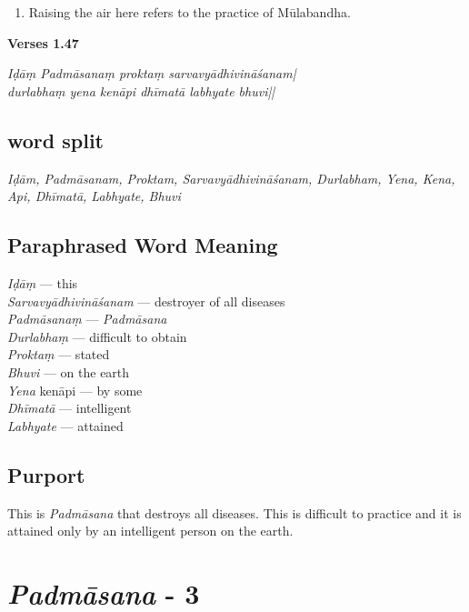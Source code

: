 \begin{enumerate}
\item Raising the air here refers to the practice of Mūlabandha.   
\end{enumerate}

\noindent \textbf{Verses 1.47}

\begin{shloka}
\textit{Iḍāṃ Padmāsanaṃ proktaṃ sarvavyādhivināśanam|\\
durlabhaṃ yena kenāpi dhīmatā labhyate bhuvi||}
\end{shloka}

\subsection*{word split}

\textit{Iḍām, Padmāsanam, Proktam, Sarvavyādhivināśanam,  Durlabham, Yena, Kena, Api, Dhīmatā, Labhyate, Bhuvi}

\subsection*{Paraphrased Word Meaning}

\begin{multicols}{2}
\textit{Iḍāṃ} ---  this  \\
\textit{Sarvavyādhivināśanam} --- destroyer of all diseases  \\
\textit{Padmāsanaṃ} ---  \textit{Padmāsana} \\
\textit{Durlabhaṃ} ---  difficult to obtain \\ 
\textit{Proktaṃ} ---  stated  \\
\textit{Bhuvi} --- on the earth  \\
\textit{Yena} kenāpi ---  by some  \\
\textit{Dhīmatā} ---  intelligent  \\
\textit{Labhyate} --- attained
\end{multicols}

\subsection*{Purport}

This is \textit{Padmāsana} that destroys all diseases. This is difficult to practice and it is attained only by an intelligent person on the earth.

\section*{\textit{Padmāsana} - 3}

